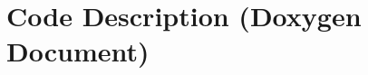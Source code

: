 \documentclass[11pt, oneside]{article}   	%
\begin{document}




%


%

\appendix
\section{Code Description (Doxygen Document)}
\label{sec:form-fram-requ}

\end{document}
